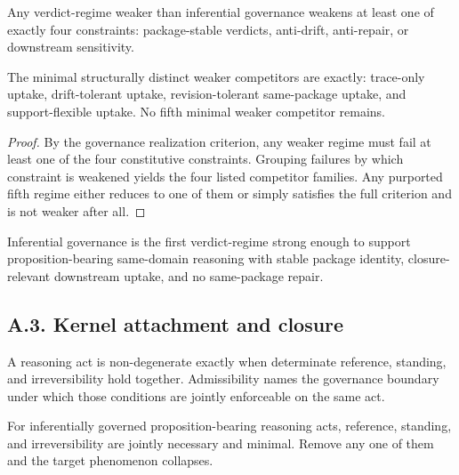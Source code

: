 \begin{proposition}
Any verdict-regime weaker than inferential governance weakens at least one of exactly four constraints: package-stable verdicts, anti-drift, anti-repair, or downstream sensitivity.
\end{proposition}

\begin{theorem}
The minimal structurally distinct weaker competitors are exactly: trace-only uptake, drift-tolerant uptake, revision-tolerant same-package uptake, and support-flexible uptake. No fifth minimal weaker competitor remains.
\end{theorem}

\begin{proof}
By the governance realization criterion, any weaker regime must fail at least one of the four constitutive constraints. Grouping failures by which constraint is weakened yields the four listed competitor families. Any purported fifth regime either reduces to one of them or simply satisfies the full criterion and is not weaker after all.
\end{proof}

\begin{theorem}
Inferential governance is the first verdict-regime strong enough to support proposition-bearing same-domain reasoning with stable package identity, closure-relevant downstream uptake, and no same-package repair.
\end{theorem}

\subsection*{A.3. Kernel attachment and closure}

\begin{definition}
A reasoning act is non-degenerate exactly when determinate reference, standing, and irreversibility hold together. Admissibility names the governance boundary under which those conditions are jointly enforceable on the same act.
\end{definition}

\begin{theorem}
For inferentially governed proposition-bearing reasoning acts, reference, standing, and irreversibility are jointly necessary and minimal. Remove any one of them and the target phenomenon collapses.
\end{theorem}

